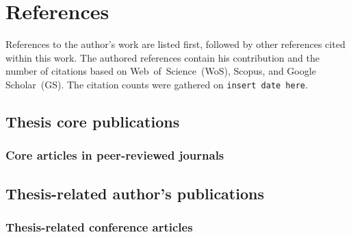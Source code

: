 





\appendix
\renewcommand\chaptername{Appendix}


\chapter{References}

References to the author's work are listed first, followed by other references cited within this work.
The authored references contain his contribution and the number of citations based on Web~of~Science~(WoS), Scopus, and Google Scholar~(GS).
The citation counts were gathered on {\color{red} \texttt{insert date here}}.

\section{Thesis core publications}

\subsection*{Core articles in peer-reviewed journals}

\printbibliography[keyword={mine},keyword={phd_related},keyword={journal},keyword={core},notkeyword={submitted},heading=none,title={}]

\section{Thesis-related author's publications}

\subsection*{Thesis-related conference articles}

\printbibliography[keyword={mine},keyword={phd_related},keyword={conference},notkeyword={core},notkeyword={submitted},heading=none,title={}]

